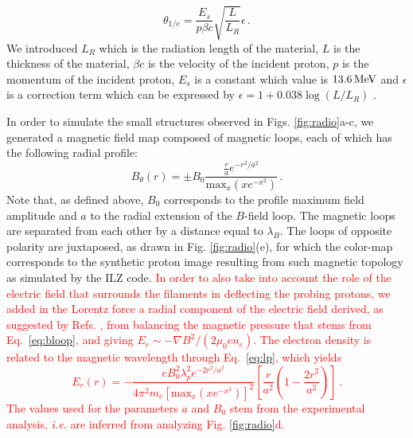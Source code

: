 \documentclass[aps,twocolumn,showpacs,superscriptaddress]{revtex4}
\begin{document}
\begin{equation}
\theta_{1/e}  = \frac{E_s}{p\beta c} \sqrt{\frac{L}{L_R}} \epsilon  \, .
\end{equation}
We introduced $L_R$ which is the radiation length of the material, $L$ is the thickness of the material, $\beta c$ is the velocity of the incident proton, $p$ is the momentum of the incident proton, $E_s$ is a constant which value is $13.6\,\rm MeV$ and  $\epsilon$ is a correction term which can be expressed by $\epsilon  = 1 + 0.038 \log\left(L/L_R\right)$ \cite{EPJ_Groom_2000}. 

In order to simulate the small structures observed in Figs. \ref{fig:radio}a-c, we generated a magnetic field map composed of magnetic loops, each of which has the following radial profile:
\begin{equation}\label{eq:bloop}
B_\theta(r)  = \pm B_0  \frac{ \frac{r}{a} e^{-r^2/a^2} }{\mathrm{max}_x(xe^{-x^2})} \, .
\end{equation} %
Note that, as defined above, $B_0$ corresponds to the profile maximum field amplitude and $a$ to the radial extension of the $B$-field loop.
The magnetic loops are separated from each other by a distance equal to $\lambda_B$.
The loops of opposite polarity are juxtaposed, as drawn in Fig. \ref{fig:radio}(e), for which the color-map corresponds to the synthetic proton image resulting from such magnetic topology as simulated by the ILZ code.
\textcolor{red}{
In order to also take into account the role of the electric field that surrounds the filaments in deflecting the probing protons, we added in the Lorentz force a radial component of the electric field  derived, as suggested by Refs. \cite{POP_Dieckmann_2009, POP_Bret_Gremillet_2010}, from balancing the magnetic pressure that stems from Eq.~\eqref{eq:bloop}, and giving $E_r \sim -\nabla B^2 /(2\mu_0e n_e)$. The  electron density is related to the magnetic wavelength through Eq.~\eqref{eq:lp}, which yields
\begin{equation}\label{eq:eloop}
E_r(r) = -\frac{  eB_0^2\lambda_p^2   e^{-2r^2/a^2}}{4\pi^2 m_e [\mathrm{max}_x(xe^{-x^2})]^2} \left[ \frac{r}{a^2}\left( 1-\frac{2r^2}{a^2}\right)  \right]  \, .
\end{equation} 
The values used for the parameters $a$ and $B_0$ stem from the experimental analysis, \emph{i.e.} are inferred from analyzing Fig. \ref{fig:radio}d. 
}
\end{document}
